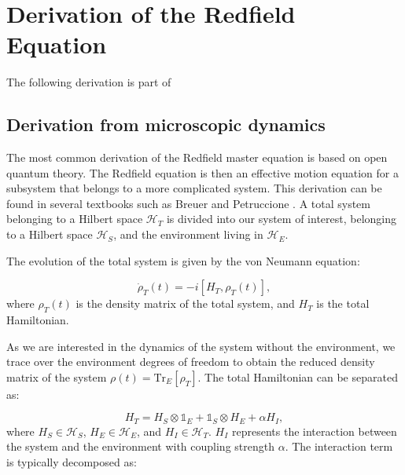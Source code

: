 
\chapter{Derivation of the Redfield Equation} %

\label{Chapter:Derivation_Redfield_Equation} %

The following derivation is part of \cite{manzanoShortIntroductionLindblad2020}

\section{Derivation from microscopic dynamics}
\label{sec:Derivation_redfield_eq_from_microscopic_dynamics}

The most common derivation of the Redfield master equation is based on open quantum theory.
The Redfield equation is then an effective motion equation for a subsystem that belongs to a more complicated system.
This derivation can be found in several textbooks such as Breuer and Petruccione \cite{breuerTheoryOpenQuantum2009}.
A total system belonging to a Hilbert space $\mathcal{H}_T$ is divided into our system of interest, belonging to a Hilbert space $\mathcal{H}_S$, and the environment living in $\mathcal{H}_E$.

The evolution of the total system is given by the von Neumann equation:

\begin{equation}
	\dot{\rho}_T(t) = -i[H_T, \rho_T(t)],
	\label{eq:Von_Neumann_Equation}
\end{equation}
where $\rho_T(t)$ is the density matrix of the total system, and $H_T$ is the total Hamiltonian.

As we are interested in the dynamics of the system without the environment, we trace over the environment degrees of freedom to obtain the reduced density matrix of the system $\rho(t) = \mathrm{Tr}_E[\rho_T]$.
The total Hamiltonian can be separated as:

\begin{equation}
	H_T = H_S \otimes \mathbb{1}_E + \mathbb{1}_S \otimes H_E + \alpha H_I,
	\label{eq:Total_Hamiltonian}
\end{equation}
where $H_S \in \mathcal{H}_S$, $H_E \in \mathcal{H}_E$, and $H_I \in \mathcal{H}_T$. $ H_I $ represents the interaction between the system and the environment with coupling strength $\alpha$.
The interaction term is typically decomposed as:

